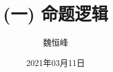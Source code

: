 \documentclass[]{beamer}
\title[(一) 命题逻辑 (Propositional Logic)]{(一) 命题逻辑}
\author[魏恒峰]{\large 魏恒峰}
\institute{hfwei@nju.edu.cn}
\date{2021年03月11日}
\begin{document}
\maketitle

% 




\thankyou{}

\end{document}
